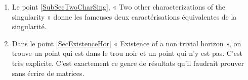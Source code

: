 \begin{enumerate}

\item
Le point \ref{SubSecTwoCharSing}, « Two other characterizations of the singularity » donne les fameuses deux caractérisations équivalentes de la singularité.

\item
Dans le point \ref{SecExistenceHor} « Existence of a non trivial horizon », on trouve un point qui est dans le trou noir et un point qui n'y est pas. C'est très explicite. C'est exactement ce genre de résultats qu'il faudrait prouver sans écrire de matrices.





\end{enumerate}


